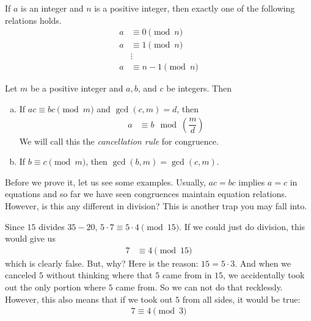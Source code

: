 \documentclass{subfile}
\begin{document}
	\begin{proposition}
		If $a$ is an integer and $n$ is a positive integer, then exactly one of the following relations holds.
			\begin{align*}
				a &\equiv 0 \pmod n\\
				a &\equiv 1 \pmod n\\
				  &\vdots\\
				a &\equiv n-1 \pmod{n}
			\end{align*}
	\end{proposition}


	\begin{theorem}
		Let $m$ be a positive integer and $a, b$, and $c$ be integers. Then
		\begin{enumerate}[(a)]
			\item If $ac \equiv bc \pmod m$ and $\gcd(c,m)=d$, then
				\begin{align*}
					 a & \equiv b \mod{\left(\dfrac{m}{d}\right)}
				 \end{align*}
			We will call this the \textit{cancellation rule} for congruence.
			\item If $b \equiv c \pmod m$, then $\gcd(b,m)=\gcd(c,m)$.
		\end{enumerate}
	\end{theorem}
Before we prove it, let us see some examples. Usually, $ac=bc$ implies $a=c$ in equations and so far we have seen congruences maintain equation relations. However, is this any different in division? This is another trap you may fall into.

Since $15$ divides $35-20$, $5\cdot7\equiv5\cdot4\pmod{15}$. If we could just do division, this would give us
	\begin{align*}
		7
			& \equiv4\pmod{15}
	\end{align*}
which is clearly false. But, why? Here is the reason: $15=5\cdot3$. And when we canceled $5$ without thinking where that $5$ came from in $15$, we accidentally took out the only portion where $5$ came from. So we can not do that recklessly. However, this also means that if we took out $5$ from all sides, it would be true:
	\begin{align*}
		7\equiv4\pmod{3}
	\end{align*}
\end{document}
